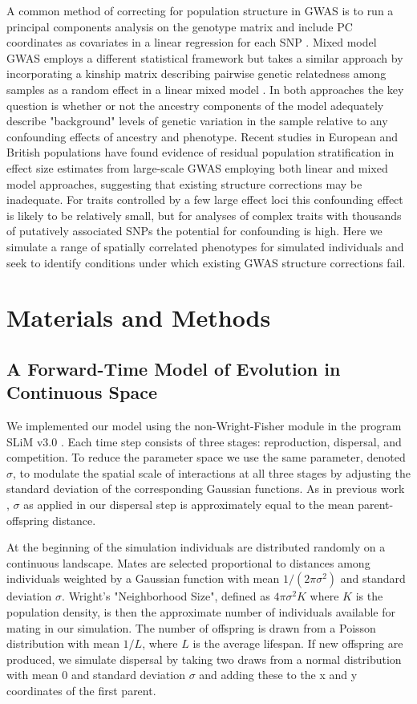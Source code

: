 \documentclass[9pt,twocolumn,twoside]{gsajnl}
\begin{document}
A common method of correcting for population structure in GWAS is to run a principal components analysis on the genotype matrix and include PC coordinates as covariates in a linear regression for each SNP \citep{Price2006}. Mixed model GWAS employs a different statistical framework but takes a similar approach by incorporating a kinship matrix describing pairwise genetic relatedness among samples as a random effect in a linear mixed model \citep{Kang2010}. In both approaches the key question is whether or not the ancestry components of the model adequately describe "background" levels of genetic variation in the sample relative to any confounding effects of ancestry and phenotype. Recent studies in European and British populations \citep{Kerminen2018,Berg2018,Sohail2018} have found evidence of residual population stratification in effect size estimates from large-scale GWAS employing both linear and mixed model approaches, suggesting that existing structure corrections may be inadequate. For traits controlled by a few large effect loci this confounding effect is likely to be relatively small, but for analyses of complex traits with thousands of putatively associated SNPs the potential for confounding is high. Here we simulate a range of spatially correlated phenotypes for simulated individuals and seek to identify conditions under which existing GWAS structure corrections fail.  
\section{Materials and Methods}
\label{sec:materials:methods}

\subsection{A Forward-Time Model of Evolution in Continuous Space}

We implemented our model using the non-Wright-Fisher module in the program SLiM v3.0 \citep{Haller2019}. Each time step consists of three stages: reproduction, dispersal, and competition. To reduce the parameter space we use the same parameter, denoted $\sigma$, to modulate the spatial scale of interactions at all three stages by adjusting the standard deviation of the corresponding Gaussian functions. As in previous work \citep{Wright1943,Ringbauer2017}, $\sigma$ as applied in our dispersal step is approximately equal to the mean parent-offspring distance.  

At the beginning of the simulation individuals are distributed randomly on a continuous landscape. Mates are selected proportional to distances among individuals weighted by a Gaussian function with mean $1/(2\pi\sigma^2)$ and standard deviation $\sigma$. Wright's \cite{Wright1943} "Neighborhood Size", defined as $4\pi\sigma^2 K$ where $K$ is the population density, is then the approximate number of individuals available for mating in our simulation. The number of offspring is drawn from a Poisson distribution with mean $1/L$, where $L$ is the average lifespan. If new offspring are produced, we simulate dispersal by taking two draws from a normal distribution with mean 0 and standard deviation $\sigma$ and adding these to the x and y coordinates of the first parent. 
\end{document}
